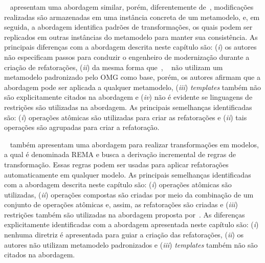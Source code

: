~ apresentam uma abordagem similar, porém, diferentemente de~, modificações realizadas são armazenadas em uma instância concreta de um metamodelo, e, em seguida, a abordagem identifica padrões de transformações, os quais podem ser replicados em outras instâncias do metamodelo para manter sua consistência. As principais diferenças com a abordagem descrita neste capítulo são: (\textit{i}) os autores não especificam passos para conduzir o engenheiro de modernização durante a criação de refatorações, (\textit{ii}) da mesma forma que~, ~ não utilizam um metamodelo padronizado pelo OMG como base, porém, os autores afirmam que a abordagem pode ser aplicada a qualquer metamodelo, (\textit{iii}) \textit{templates} também não são explicitamente citados na abordagem e (\textit{iv}) não é evidente se linguagens de restrições são utilizadas na abordagem. As principais semelhanças identificadas são: (\textit{i}) operações atômicas são utilizadas para criar as refatorações e (\textit{ii}) tais operações são agrupadas para criar a refatoração.  



~ também apresentam uma abordagem para realizar transformações em modelos, a qual é denominada REMA e busca a derivação incremental de regras de transformação. Essas regras podem ser usadas para aplicar refatorações automaticamente em qualquer modelo. As principais semelhanças identificadas com a abordagem descrita neste capítulo são: (\textit{i}) operações atômicas são utilizadas, (\textit{ii}) operações compostas são criadas por meio da combinação de um conjunto de operações atômicas e, assim, as refatorações são criadas e (\textit{iii}) restrições também são utilizadas na abordagem proposta por~. As diferenças explicitamente identificadas com a abordagem apresentada neste capítulo são: (\textit{i}) nenhuma diretriz é apresentada para guiar a criação das refatorações, (\textit{ii}) os autores não utilizam metamodelo padronizados e (\textit{iii}) \textit{templates} também não são citados na abordagem.   



